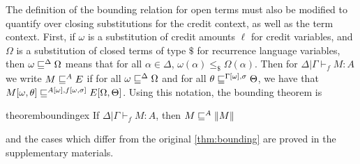 The definition of the bounding relation for open terms must also be modified to quantify over closing substitutions for the credit context, as well as the term context.
First, if $\omega$ is a substitution of credit amounts $\ell$ for credit variables, and $\Omega$ is a substitution of closed terms of type $\$$ for recurrence language variables, then $\omega \sqsubseteq^{\Delta} \Omega$ means that for all $\alpha \in \Delta$, $\omega(\alpha) \leq_\$ \Omega(\alpha)$.
Then for $\Delta | \Gamma \vdash_f M : A$ we write $M \sqsubseteq^A E$ if for all $\omega \sqsubseteq^{\Delta} \Omega$ and for all $\theta \sqsubseteq^{\Gamma[\omega],\sigma} \Theta$, we have that $M[\omega,\theta] \sqsubseteq^{A[\omega],f[\omega,\sigma]} E[\Omega,\Theta]$.
Using this notation, the bounding theorem is
\begin{restatable}{theorem}{boundingex}
\label{thm:bounding-ex}
If $\Delta | \Gamma \vdash_f M : A$, then $M \sqsubseteq^A \left\lVert M\right\rVert$
\end{restatable}
\noindent and the cases which differ from the original \autoref{thm:bounding} are proved in the supplementary materials.


